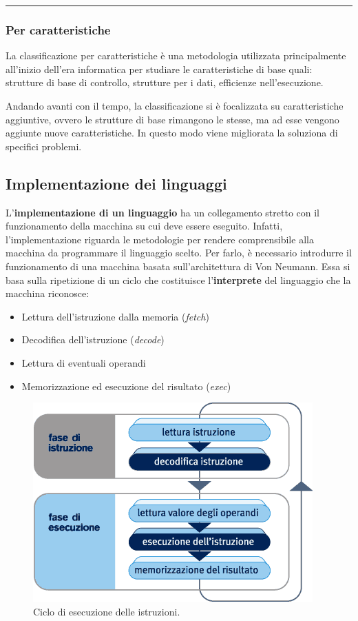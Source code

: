 \documentclass[a4paper]{article}
\newcommand{\longline}{\noindent\rule{\textwidth}{0.4pt}}
\begin{document}
	\longline

	\subsubsection{Per caratteristiche}
	
	La classificazione per caratteristiche è una metodologia utilizzata principalmente all'inizio dell'era informatica per studiare le caratteristiche di base quali: strutture di base di controllo, strutture per i dati, efficienze nell'esecuzione.\newline
	
	\noindent
	Andando avanti con il tempo, la classificazione si è focalizzata su caratteristiche aggiuntive, ovvero le strutture di base rimangono le stesse, ma ad esse vengono aggiunte nuove caratteristiche. In questo modo viene migliorata la soluziona di specifici problemi.\newpage
	
	\subsection{Implementazione dei linguaggi}
	
	L'\textbf{implementazione di un linguaggio} ha un collegamento stretto con il funzionamento della macchina su cui deve essere eseguito. Infatti, l'implementazione riguarda le metodologie per rendere comprensibile alla macchina da programmare il linguaggio scelto. Per farlo, è necessario introdurre il funzionamento di una macchina basata sull'architettura di Von Neumann. Essa si basa sulla ripetizione di un ciclo che costituisce l'\textbf{interprete} del linguaggio che la macchina riconosce:
	\begin{itemize}
		\item Lettura dell'istruzione dalla memoria (\emph{fetch})
		
		\item Decodifica dell'istruzione (\emph{decode})
		
		\item Lettura di eventuali operandi
		
		\item Memorizzazione ed esecuzione del risultato (\emph{exec})
	\end{itemize}
	\begin{figure}[!htp]
		\centering
		\includegraphics[width=.75\textwidth]{img/fasi_esecuzione.png}
		\caption{Ciclo di esecuzione delle istruzioni.}
	\end{figure}
\end{document}
